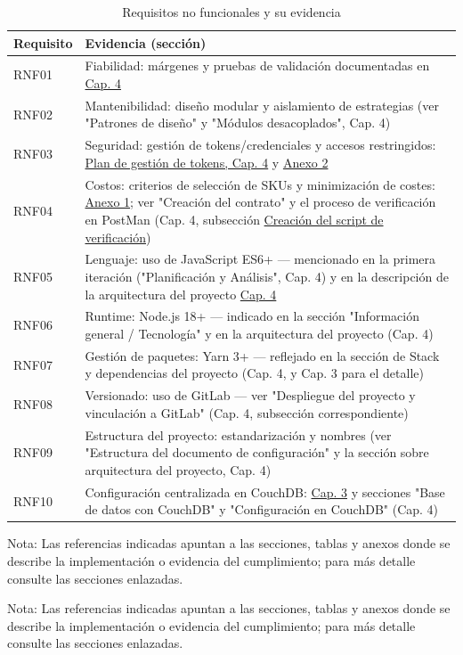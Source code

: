 \begin{table}[h!]
	\centering
	\small
	\setlength{\tabcolsep}{6pt}
	\begin{tabular}{|p{2.2cm}|p{14cm}|}
		\hline
			\textbf{Requisito} & \textbf{Evidencia (sección)} \\
		\hline
		RNF01 & Fiabilidad: márgenes y pruebas de validación documentadas en \hyperref[chap:iteraciones]{Cap. 4} \\
		\hline
		RNF02 & Mantenibilidad: diseño modular y aislamiento de estrategias (ver "Patrones de diseño" y "Módulos desacoplados", Cap. 4) \\
		\hline
		RNF03 & Seguridad: gestión de tokens/credenciales y accesos restringidos: \hyperref[iteraciones:gestion-tokens]{Plan de gestión de tokens, Cap. 4} y \hyperref[anexo:Obtener-Tocken-DCD]{Anexo 2} \\
		\hline
		RNF04 & Costos: criterios de selección de SKUs y minimización de costes: \hyperref[anexo:Lista-de-SKUs]{Anexo 1}; ver "Creación del contrato" y el proceso de verificación en PostMan (Cap. 4, subsección \hyperref[iteraciones:script-verificacion-postman]{Creación del script de verificación}) \\
		\hline
		RNF05 & Lenguaje: uso de JavaScript ES6+ — mencionado en la primera iteración ("Planificación y Análisis", Cap. 4) y en la descripción de la arquitectura del proyecto \hyperref[chap:iteraciones]{Cap. 4} \\
		\hline
		RNF06 & Runtime: Node.js 18+ — indicado en la sección "Información general / Tecnología" y en la arquitectura del proyecto (Cap. 4) \\
		\hline
		RNF07 & Gestión de paquetes: Yarn 3+ — reflejado en la sección de Stack y dependencias del proyecto (Cap. 4, y Cap. 3 para el detalle) \\
		\hline
		RNF08 & Versionado: uso de GitLab — ver "Despliegue del proyecto y vinculación a GitLab" (Cap. 4, subsección correspondiente) \\
		\hline
		RNF09 & Estructura del proyecto: estandarización y nombres (ver "Estructura del documento de configuración" y la sección sobre arquitectura del proyecto, Cap. 4) \\
		\hline
		RNF10 & Configuración centralizada en CouchDB: \hyperref[tab:stack-tecnologico]{Cap. 3} y secciones "Base de datos con CouchDB" y "Configuración en CouchDB" (Cap. 4) \\
		\hline
	\end{tabular}
	\caption{Requisitos no funcionales y su evidencia}
\end{table}

\vspace{6pt}
\noindent Nota: Las referencias indicadas apuntan a las secciones, tablas y anexos donde se describe la implementación o evidencia del cumplimiento; para más detalle consulte las secciones enlazadas.

\vspace{6pt}
\noindent Nota: Las referencias indicadas apuntan a las secciones, tablas y anexos donde se describe la implementación o evidencia del cumplimiento; para más detalle consulte las secciones enlazadas.
